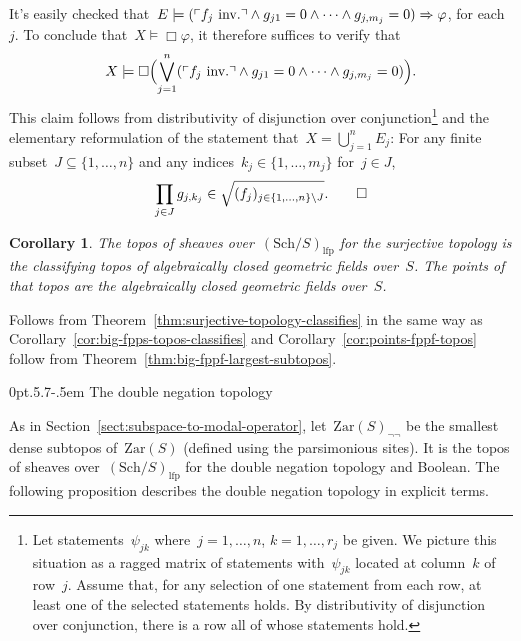\documentclass[10pt,reqno,a4paper]{amsbook}
\makeatletter
\theoremstyle{definition}
\theoremstyle{plain}
\newtheorem{cor}[defn]{Corollary}
\theoremstyle{remark}
\newcommand{\Zar}{\mathrm{Zar}}
\newcommand{\Sch}{\mathrm{Sch}}
\newcommand{\lfp}{\mathrm{lfp}}
\newcommand{\?}{\,{:}\,}
\renewcommand{\_}{\mathpunct{.}\,}
\newcommand{\speak}[1]{\ulcorner\text{\textnormal{#1}}\urcorner}
\newcommand{\inv}{inv.\@}
\renewenvironment{proof}[1][\proofname]{\par
  \pushQED{\qed}%
  \normalfont \topsep6\p@\@plus6\p@\relax
  \trivlist
  \item[\hskip\labelsep
        \itshape
    #1\@addpunct{.}]\ignorespaces
}{%
  \popQED\endtrivlist\@endpefalse
}
\def\subsection{\@startsection{subsection}{2}%
  {0pt}{.5\linespacing\@plus.7\linespacing}{-.5em}%
  {\normalfont\bfseries}}
\makeatother
\begin{document}
\begin{proof}
It's easily checked that~$E \models (\speak{$f_j$ \inv} \wedge g_{j1} = 0
\wedge \cdots \wedge g_{j,m_j} = 0) \Rightarrow \varphi$, for each~$j$. To
conclude that~$X \models \Box\varphi$, it therefore suffices to verify that
\[ X \models \Box\Bigl(\bigvee_{j=1}^n (\speak{$f_j$ \inv} \wedge
  g_{j1} = 0 \wedge \cdots \wedge g_{j,m_j} = 0)\Bigr). \]
This claim follows from distributivity of disjunction over conjunction\footnote{Let
statements~$\psi_{jk}$ where~$j = 1,\ldots,n$, $k = 1,\ldots,r_j$ be given.
We picture this situation as a ragged matrix of statements with~$\psi_{jk}$ located
at column~$k$ of row~$j$. Assume that, for any selection of one statement from
each row, at least one of the selected statements holds. By distributivity of
disjunction over conjunction, there is a row all of whose statements hold.}
and the elementary reformulation of the statement that~$X = \bigcup_{j=1}^n
E_j$: For any finite subset~$J \subseteq \{1,\ldots,n\}$ and any indices~$k_j
\in \{ 1, \ldots, m_j \}$ for~$j \in J$,
\[ \prod_{j \in J} g_{j, k_j} \in \sqrt{(f_j)_{j \in \{1,\ldots,n\} \setminus J}}. \qedhere \]
\end{proof}

\begin{cor}The topos of sheaves over~$(\Sch/S)_\lfp$ for the surjective
topology is the classifying topos of algebraically closed geometric fields
over~$S$. The points of that topos are the algebraically closed geometric
fields over~$S$.\end{cor}

\begin{proof}Follows from Theorem~\ref{thm:surjective-topology-classifies} in
the same way as Corollary~\ref{cor:big-fpps-topos-classifies} and
Corollary~\ref{cor:points-fppf-topos} follow from
Theorem~\ref{thm:big-fppf-largest-subtopos}.
\end{proof}


\subsection{The double negation topology}

As in Section~\ref{sect:subspace-to-modal-operator}, let~$\Zar(S)_{\neg\neg}$
be the smallest dense subtopos of~$\Zar(S)$ (defined using the parsimonious
sites). It is the topos of sheaves over~$(\Sch/S)_\lfp$ for the double
negation topology and Boolean. The following proposition describes the double
negation topology in explicit terms.
\end{document}
